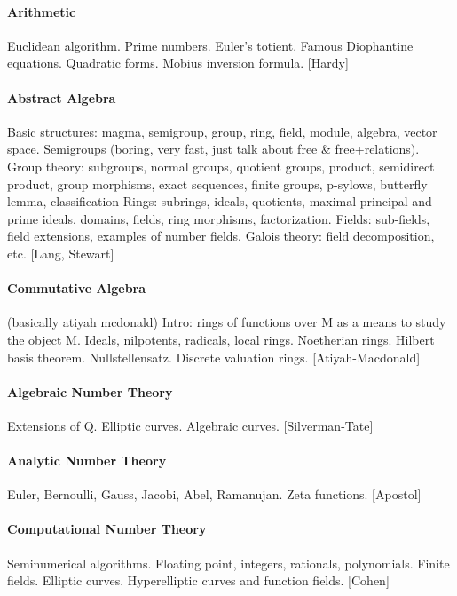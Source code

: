 \paragraph{Arithmetic}
Euclidean algorithm.
Prime numbers. Euler's totient.
Famous Diophantine equations.
Quadratic forms.
Mobius inversion formula.
[Hardy]

\paragraph{Abstract Algebra}
Basic structures: magma, semigroup, group, ring, field, module, algebra,
vector space.
Semigroups (boring, very fast, just talk about free \& free+relations).
Group theory: subgroups, normal groups, quotient groups, product, semidirect
product, group morphisms, exact sequences, finite groups, p-sylows, butterfly
lemma, classification
Rings: subrings, ideals, quotients, maximal principal and prime ideals,
domains, fields, ring morphisms, factorization.
Fields: sub-fields, field extensions, examples of number fields.
Galois theory: field decomposition, etc.
[Lang, Stewart]

\paragraph{Commutative Algebra}
(basically atiyah mcdonald)
Intro: rings of functions over M as a means to study the object M.
Ideals, nilpotents, radicals, local rings.
Noetherian rings.  Hilbert basis theorem.
Nullstellensatz.
Discrete valuation rings.
[Atiyah-Macdonald]

\paragraph{Algebraic Number Theory}
Extensions of Q.
Elliptic curves.
Algebraic curves.
[Silverman-Tate]


\paragraph{Analytic Number Theory}
Euler, Bernoulli, Gauss, Jacobi, Abel, Ramanujan.
Zeta functions.
[Apostol]

\paragraph{Computational Number Theory}
Seminumerical algorithms.  Floating point, integers, rationals, polynomials.
Finite fields.
Elliptic curves.
Hyperelliptic curves and function fields.
[Cohen]

